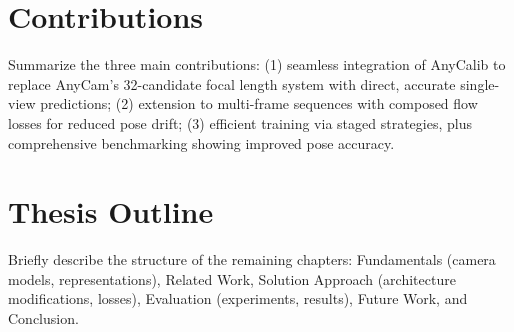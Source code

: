 \section{Contributions}\label{sec:contributions}
Summarize the three main contributions: (1) seamless integration of AnyCalib to replace AnyCam's 32-candidate focal length system with direct, accurate single-view predictions; (2) extension to multi-frame sequences with composed flow losses for reduced pose drift; (3) efficient training via staged strategies, plus comprehensive benchmarking showing improved pose accuracy.

\section{Thesis Outline}\label{sec:outline}
Briefly describe the structure of the remaining chapters: Fundamentals (camera models, representations), Related Work, Solution Approach (architecture modifications, losses), Evaluation (experiments, results), Future Work, and Conclusion.


